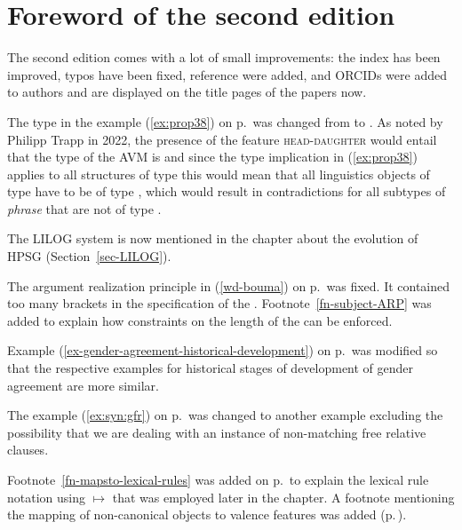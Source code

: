\section*{Foreword of the second edition}

\largerpage
The second edition comes with a lot of small improvements: the index has been improved, typos have
been fixed, reference were added, and ORCIDs were added to authors and are displayed on the title pages of the papers now.

The type in the example (\ref{ex:prop38})
on p.\,\pageref{ex:prop38} was changed from  to . As noted by
Philipp Trapp in 2022, the presence of the feature \textsc{head-daughter} would entail that the type
of the AVM is  and since the type implication in (\ref{ex:prop38}) applies to all
structures of type  this would mean that all linguistics objects of type  have to be
of type , which would result in contradictions for all subtypes of \emph{phrase}
that are not of type .

The LILOG system is now mentioned in the chapter about the evolution of HPSG (Section~\ref{sec-LILOG}).

The argument realization principle in (\ref{wd-bouma}) on p.\,\pageref{wd-bouma} was fixed. It
contained too many brackets in the specification of the \depsl. Footnote~\ref{fn-subject-ARP} was
added to explain how constraints on the length of the \subjl can be enforced.

Example (\ref{ex-gender-agreement-historical-development}) on
p.\,\pageref{ex-gender-agreement-historical-development} was modified so that the respective
examples for historical stages of development of gender agreement are more similar.

The example (\ref{ex:syn:gfr}) on p.\,\pageref{ex:syn:gfr} was changed to another example excluding the possibility that we
are dealing with an instance of non-matching free relative clauses.

Footnote~\ref{fn-mapsto-lexical-rules} was added on p.\,\pageref{fn-mapsto-lexical-rules} to explain
the lexical rule notation using $\mapsto$ that was employed later in the chapter. A footnote
mentioning the mapping of non-canonical objects to valence features was added (p.\,\pageref{fn-non-cannonical-arg-st}). 

